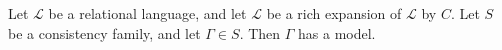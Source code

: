 Let $\mathcal{L}$ be a relational language, and let $\mathcal{L}$ be a rich expansion of $\mathcal{L}$ by $C$. Let $S$ be a consistency family, and let $\Gamma \in S$. Then $\Gamma$ has a model.
